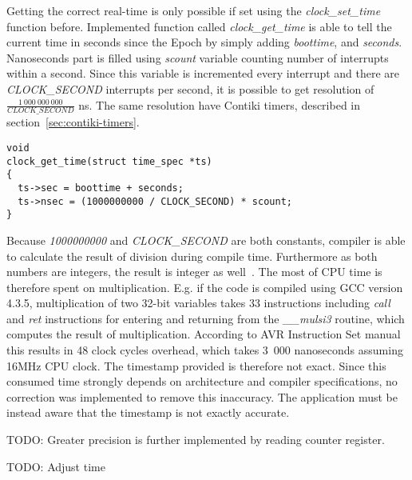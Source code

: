 Getting the correct real-time is only possible if set using
the {\it{clock\_set\_time}} function before.
Implemented function called {\it{clock\_get\_time}} is able to tell the
current time in seconds since the Epoch by simply adding {\it{boottime}},
and {\it{seconds}}.
Nanoseconds part is filled using {\it{scount}} variable counting number of
interrupts within a second.
Since this variable is incremented every interrupt and there are {\it{CLOCK\_SECOND}} interrupts
per second, it is possible to get resolution of $\frac{1~000~000~000}{CLOCK\_SECOND}$ ns.
The same resolution have Contiki timers, described in section~\ref{sec:contiki-timers}.
\begin{lstlisting}
void
clock_get_time(struct time_spec *ts)
{
  ts->sec = boottime + seconds;
  ts->nsec = (1000000000 / CLOCK_SECOND) * scount;
}
\end{lstlisting}
Because {\it{1000000000}} and {\it{CLOCK\_SECOND}} are both constants, compiler is able to
calculate the result of division during compile time.
Furthermore as both numbers are integers, the result is integer as well~\cite{c99}.
The most of CPU time is therefore spent on multiplication.
E.g. if the code is compiled using GCC version 4.3.5,
multiplication of two 32-bit variables takes 33 instructions including {\it{call}} and {\it{ret}}
instructions for entering and returning from the {\it{\_\_mulsi3}} routine, which computes
the result of multiplication.
According to AVR Instruction Set manual~\cite{avr-instruction-set} this results in 48 clock cycles overhead,
which takes 3~000 nanoseconds assuming 16MHz CPU clock.
The timestamp provided is therefore not exact.
Since this consumed time strongly depends on architecture and compiler specifications,
no correction was implemented to remove this inaccuracy.
The application must be instead aware that the timestamp is not exactly accurate.

TODO: Greater precision is further implemented by reading counter register.

TODO: Adjust time
